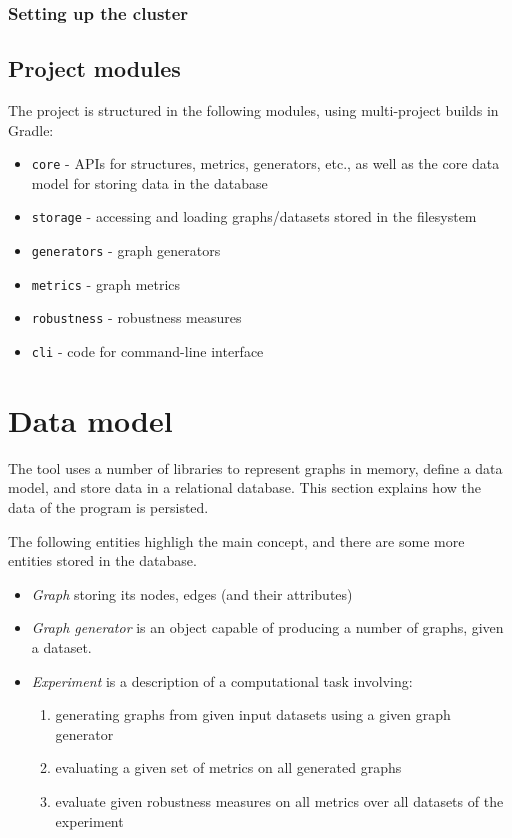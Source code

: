 \subsubsection*{Setting up the cluster}

\subsection{Project modules}

The project is structured in the following modules, using multi-project builds in Gradle:
\begin{itemize}
    \item \texttt{core} - APIs for structures, metrics, generators, etc., as well as the core data model for storing data in the database
    \item \texttt{storage} - accessing and loading graphs/datasets stored in the filesystem
    \item \texttt{generators} - graph generators
    \item \texttt{metrics} - graph metrics
    \item \texttt{robustness} - robustness measures
    \item \texttt{cli} - code for command-line interface
\end{itemize}



\section{Data model}

The \graffs tool uses a number of libraries to represent graphs in memory, define a data model, and store data in a relational database.
This section explains how the data of the program is persisted.

The following entities highligh the main concept, and there are some more entities stored in the database.
\begin{itemize}[topsep=5pt]
    \item \textsl{Graph} storing its nodes, edges (and their attributes)
    \item \textsl{Graph generator} is an object capable of producing a number of graphs, given a dataset.
    \item \textsl{Experiment} is a description of a computational task involving:
    \begin{enumerate}[topsep=5pt]
        \item generating graphs from given input datasets using a given graph generator
        \item evaluating a given set of metrics on all generated graphs
        \item evaluate given robustness measures on all metrics over all datasets of the experiment
    \end{enumerate}
\end{itemize}

